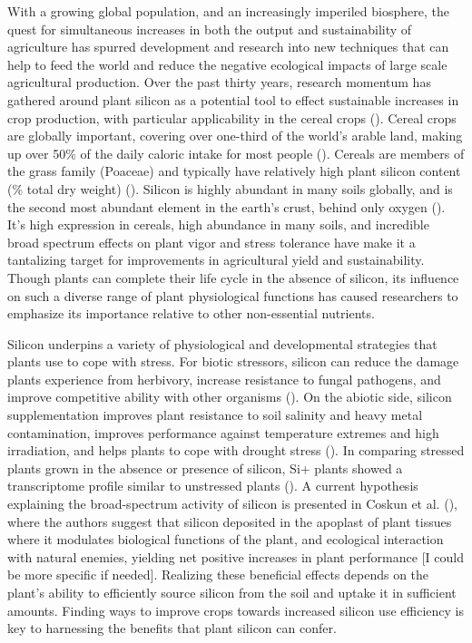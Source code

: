 \documentclass[12pt, letterpaper, ]{article}
\begin{document}
With a growing global population, and an increasingly imperiled biosphere, the quest for simultaneous increases in both the output and sustainability of agriculture has spurred development and research into new techniques that can help to feed the world and reduce the negative ecological impacts of large scale agricultural production. Over the past thirty years, research momentum has gathered around plant silicon as a potential tool to effect sustainable increases in crop production, with particular applicability in the cereal crops (\cite{reynolds_silicon_2016,christian_breeding_2022}). Cereal crops are globally important, covering over one-third of the world’s arable land, making up over 50\% of the daily caloric intake for most people (\cite{faostat, rudel_agricultural_2009, awika_major_2011}). Cereals are members of the grass family (Poaceae) and typically have relatively high plant silicon content (\% total dry weight) (\cite{reynolds_silicon_2016}). Silicon is highly abundant in many soils globally, and is the second most abundant element in the earth’s crust, behind only oxygen (\cite{ma_functions_2003}). It’s high expression in cereals, high abundance in many soils, and incredible broad spectrum effects on plant vigor and stress tolerance have make it a tantalizing target for improvements in agricultural yield and sustainability. Though plants can complete their life cycle in the absence of silicon, its influence on such a diverse range of plant physiological functions has caused researchers to emphasize its importance relative to other non-essential nutrients. 

Silicon underpins a variety of physiological and developmental strategies that plants use to cope with stress. For biotic stressors, silicon can reduce the damage plants experience from herbivory, increase resistance to fungal pathogens, and improve competitive ability with other organisms (\cite{fauteux_silicon_2005, katz_silicon_2019}). On the abiotic side, silicon supplementation improves plant resistance to soil salinity and heavy metal contamination, improves performance against temperature extremes and high irradiation, and helps plants to cope with drought stress (\cite{cooke_consistent_2016}). In comparing stressed plants grown in the absence or presence of silicon, Si+ plants showed a transcriptome profile similar to unstressed plants (\cite{coskun_controversies_2019}). A current hypothesis explaining the broad-spectrum activity of silicon is presented in Coskun et al. (\citeyear{coskun_controversies_2019}), where the authors suggest that silicon deposited in the apoplast of plant tissues where it modulates biological functions of the plant, and ecological interaction with natural enemies, yielding net positive increases in plant performance [I could be more specific if needed]. Realizing these beneficial effects depends on the plant’s ability to efficiently source silicon from the soil and uptake it in sufficient amounts. Finding ways to improve crops towards increased silicon use efficiency is key to harnessing the benefits that plant silicon can confer. 
\end{document}
